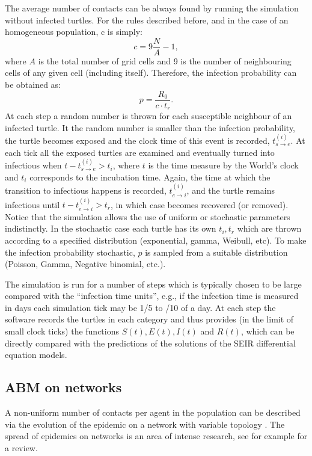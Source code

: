 \documentclass[a4paper,oneside,11pt]{article}
\begin{document}
The average number of contacts can be always found by running the simulation without infected turtles. For the rules described before, and in the case of an homogeneous population, c is simply:
\begin{equation}
c = 9 \frac{N}{A}-1,
\end{equation}
%
where $A$ is the total number of grid cells and 9 is the number of  neighbouring cells of any given cell (including itself). Therefore, the infection probability can be obtained as:
\begin{equation}
p = \frac{R_0}{c \cdot t_r}.
\end{equation}
At each step a random number is thrown for each susceptible neighbour of an infected turtle. It the random number is smaller than the infection probability, the turtle becomes exposed and the clock time of this event is recorded, $t_{s\rightarrow e}^{(i)}$. At each tick all the exposed turtles are examined and eventually turned into infectious when 
$t - t^{(i)}_{s\rightarrow e} > t_i$, where $t$ is the time measure by the World's clock and $t_i$ corresponds to the incubation time. Again, the time at which the transition to infectious happens is recorded, $t^{(i)}_{e\rightarrow i}$, and the turtle remains infectious until $t - t^{(i)}_{e\rightarrow i} > t_r$, in which case becomes recovered (or removed).
Notice that the simulation allows the use of uniform or stochastic parameters indistinctly. In the stochastic case each turtle has its own $t_i, t_r$ which are thrown according to a specified distribution (exponential, gamma, Weibull, etc). To make the infection probability stochastic, $p$ is sampled from a suitable distribution (Poisson, Gamma, Negative binomial, etc.).

The simulation is run for a number of steps which is typically chosen to be large compared with the ``infection time units'', e.g., if the infection time is measured in days each simulation tick may be 1/5 to /10 of a day. At each step the software records the turtles in each category and thus provides (in the limit of small clock ticks) the functions $S(t), E(t), I(t)$ and $R(t)$, which can be directly compared with the predictions of the solutions of the SEIR differential equation models.

\subsection{ABM on networks}

A non-uniform number of contacts per agent in the population can be described via the evolution of the epidemic on a network with variable topology \cite{Albert_2002}. The spread of epidemics on networks is an area of intense research, see for example \cite{Pastor_Satorras_2015}
for a review.
\end{document}
